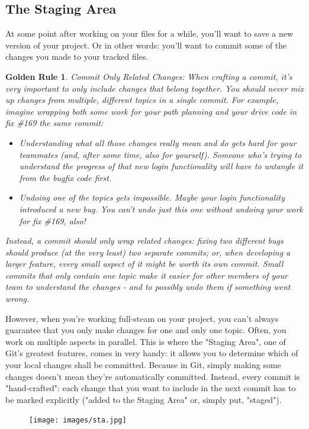 \documentclass{article}
\begin{document}
\subsection{The Staging Area}
At some point after working on your files for a while, you'll want to save a new version of your project. Or in other words: you'll want to commit some of the changes you made to your tracked files.
 \newtheorem{golden-rule}{Golden Rule}
 \begin{golden-rule}Commit Only Related Changes:
 \newline\newline
When crafting a commit, it's very important to only include changes that belong together. You should never mix up changes from multiple, different topics in a single commit. For example, imagine wrapping both some work for your path planning and your drive code in fix \#169 the same commit:
\begin{itemize}
    \item Understanding what all those changes really mean and do gets hard for your teammates (and, after some time, also for yourself). Someone who's trying to understand the progress of that new login functionality will have to untangle it from the bugfix code first.
    \item Undoing one of the topics gets impossible. Maybe your login functionality introduced a new bug. You can't undo just this one without undoing your work for fix \#169, also!
\end{itemize}
Instead, a commit should only wrap related changes: fixing two different bugs should produce (at the very least) two separate commits; or, when developing a larger feature, every small aspect of it might be worth its own commit.
Small commits that only contain one topic make it easier for other members of your team to understand the changes - and to possibly undo them if something went wrong.
 \end{golden-rule}

However, when you're working full-steam on your project, you can't always guarantee that you only make changes for one and only one topic. Often, you work on multiple aspects in parallel.
 \newline\newline
This is where the "Staging Area", one of Git's greatest features, comes in very handy: it allows you to determine which of your local changes shall be committed. Because in Git, simply making some changes doesn't mean they're automatically committed. Instead, every commit is "hand-crafted": each change that you want to include in the next commit has to be marked explicitly ("added to the Staging Area" or, simply put, "staged").
\begin{figure}[h]
    \centering
    \texttt{[image: images/sta.jpg]}
\end{figure}
\end{document}
